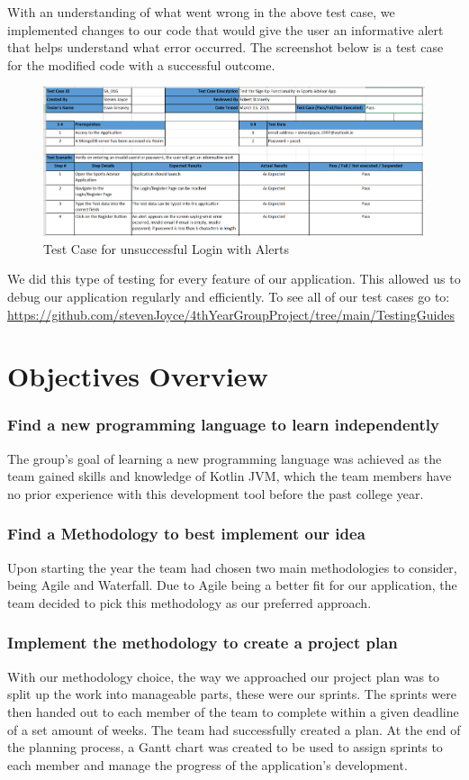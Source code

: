 With an understanding of what went wrong in the above test case, we implemented changes to our code that would give the user an informative alert that helps understand what error occurred. The screenshot below is a test case for the modified code with a successful outcome.
\begin{figure}[H]
    \centering
    \includegraphics[width=15cm, height = 6.5 cm]{img/testCaseSignInError.PNG}
    \caption{Test Case for unsuccessful Login with Alerts}
    \label{fig:altas config}
\end{figure}
We did this type of testing for every feature of our application. This allowed us to debug our application regularly and efficiently. To see all of our test cases go to:  \url{https://github.com/stevenJoyce/4thYearGroupProject/tree/main/TestingGuides}
\section{Objectives Overview}
\subsubsection{Find a new programming language to learn independently}
The group's goal of learning a new programming language was achieved as the team gained skills and knowledge of Kotlin JVM, which the team members have no prior experience with this development tool before the past college year.
\subsubsection {Find a Methodology to best implement our idea}
Upon starting the year the team had chosen two main methodologies to consider, being Agile and Waterfall. Due to Agile being a better fit for our application, the team decided to pick this methodology as our preferred approach.
\subsubsection {Implement the methodology to create a project plan}
With our methodology choice, the way we approached our project plan was to split up the work into manageable parts, these were our sprints. The sprints were then handed out to each member of the team to complete within a given deadline of a set amount of weeks. The team had successfully created a plan. At the end of the planning process, a Gantt chart was created to be used to assign sprints to each member and manage the progress of the application's development.
